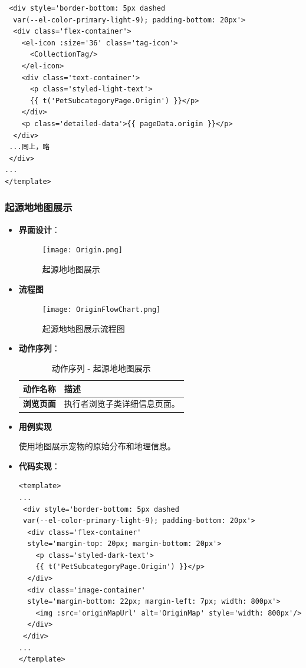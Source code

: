 \begin{itemize}
\begin{verbatim}
 <div style='border-bottom: 5px dashed
  var(--el-color-primary-light-9); padding-bottom: 20px'>
  <div class='flex-container'>
    <el-icon :size='36' class='tag-icon'>
      <CollectionTag/>
    </el-icon>
    <div class='text-container'>
      <p class='styled-light-text'>
      {{ t('PetSubcategoryPage.Origin') }}</p>
    </div>
    <p class='detailed-data'>{{ pageData.origin }}</p>
  </div>
 ...同上，略
 </div>
...
</template>
	\end{verbatim}
	
\end{itemize}

\subsubsection{起源地地图展示}

\begin{itemize}
	\item \textbf{界面设计}：
	\begin{figure}[H]
		\centering
		\texttt{[image: Origin.png]}
		\caption{起源地地图展示}
		\label{起源地地图展示}
	\end{figure}
	
	\item \textbf{流程图}
	
	\begin{figure}[H]
		\centering
		\texttt{[image: OriginFlowChart.png]}
		\caption{起源地地图展示流程图}
		\label{起源地地图展示流程图}
	\end{figure}
	
	\item \textbf{动作序列}：
	\begin{table}[H]
		\centering
		\caption{动作序列 - 起源地地图展示}
		\renewcommand\arraystretch{1.5}
		\begin{tabular}{|c|>{\raggedright\arraybackslash}p{10cm}|}
			\hline
			\textbf{动作名称} & \textbf{描述} \\ \hline
			\textbf{浏览页面} & 执行者浏览子类详细信息页面。\\ \hline
		\end{tabular}
	\end{table}
	
	\item \textbf{用例实现}
	
	使用地图展示宠物的原始分布和地理信息。
	\item \textbf{代码实现}：
	\begin{verbatim}
<template>
...
 <div style='border-bottom: 5px dashed 
 var(--el-color-primary-light-9); padding-bottom: 20px'>
  <div class='flex-container' 
  style='margin-top: 20px; margin-bottom: 20px'>
    <p class='styled-dark-text'>
    {{ t('PetSubcategoryPage.Origin') }}</p>
  </div>
  <div class='image-container' 
  style='margin-bottom: 22px; margin-left: 7px; width: 800px'>
    <img :src='originMapUrl' alt='OriginMap' style='width: 800px'/>
  </div>
 </div>
...
</template>
	\end{verbatim}
	
\end{itemize}

